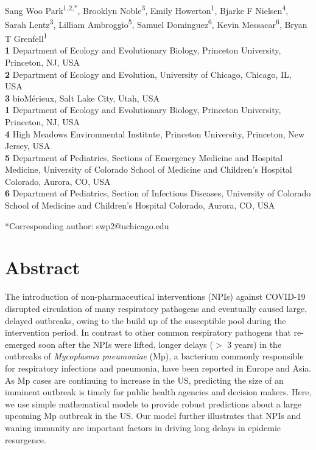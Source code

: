 \documentclass[12pt]{article}
\date{\today}
\begin{document}
\begin{flushleft}{
	\Large
	\textbf{}
}
\newline
\\ 
Sang Woo Park\textsuperscript{1,2,*}, Brooklyn Noble\textsuperscript{3}, Emily Howerton\textsuperscript{1}, Bjarke F Nielsen\textsuperscript{4}, Sarah Lentz\textsuperscript{3}, Lilliam Ambroggio\textsuperscript{5}, Samuel Dominguez\textsuperscript{6}, Kevin Messacar\textsuperscript{6}, Bryan T Grenfell\textsuperscript{1}
\\
\bigskip
\textbf{1} Department of Ecology and Evolutionary Biology, Princeton University, Princeton, NJ, USA
\\
\textbf{2} Department of Ecology and Evolution, University of Chicago, Chicago, IL, USA
\\
\textbf{3} bioMérieux, Salt Lake City, Utah, USA
\\
\textbf{1} Department of Ecology and Evolutionary Biology, Princeton University, Princeton, NJ, USA
\\
\textbf{4} High Meadows Environmental Institute, Princeton University, Princeton, New Jersey, USA
\\
\textbf{5} Department of Pediatrics, Sections of Emergency Medicine and Hospital Medicine, University of Colorado School of Medicine and Children's Hospital Colorado, Aurora, CO, USA
\\
\textbf{6} Department of Pediatrics, Section of Infectious Diseases, University of Colorado School of Medicine and Children's Hospital Colorado, Aurora, CO, USA
\\
\bigskip

*Corresponding author: swp2@uchicago.edu
\bigskip
\end{flushleft} 

\section*{Abstract}
The introduction of non-pharmaceutical interventions (NPIs) against COVID-19 disrupted circulation of many respiratory pathogens and eventually caused large, delayed outbreaks, owing to the build up of the susceptible pool during the intervention period.
In contrast to other common respiratory pathogens that re-emerged soon after the NPIs were lifted, longer delays ($>$ 3 years) in the outbreaks of \textit{Mycoplasma pneumoniae} (Mp), a bacterium commonly responsible for respiratory infections and pneumonia, have been reported in Europe and Asia.
As Mp cases are continuing to increase in the US, predicting the size of an imminent outbreak is timely for public health agencies and decision makers.
Here, we use simple mathematical models to provide robust predictions about a large upcoming Mp outbreak in the US.
Our model further illustrates that NPIs and waning immunity are important factors in driving long delays in epidemic resurgence.
\end{document}
